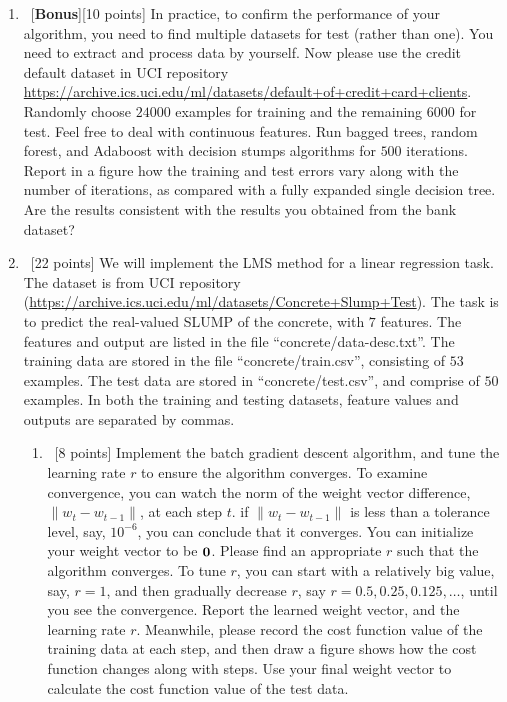 \documentclass[12pt, fullpage,letterpaper]{article}
\begin{document}
\begin{enumerate}
\item~[\textbf{Bonus}][10 points] In practice, to confirm the performance of your algorithm, you need to find multiple datasets for test (rather than one). You need to extract and process data by yourself. Now please use the credit default dataset in UCI repository \href{https://archive.ics.uci.edu/ml/datasets/default+of+credit+card+clients}{https://archive.ics.uci.edu/ml/datasets/default+of+credit+card+clients}. Randomly choose $24000$ examples for training and the remaining $6000$ for test. Feel free to deal with continuous features. Run bagged trees, random forest, and Adaboost with decision stumps algorithms for $500$ iterations. Report in a figure how the training and test errors vary along with the number of iterations, as compared with a fully expanded single decision tree. Are the results consistent with the results you obtained from the bank dataset?

	\item~[22 points] We will implement the LMS method for a linear regression task. The dataset is from UCI repository (\url{https://archive.ics.uci.edu/ml/datasets/Concrete+Slump+Test}). The task is to predict the real-valued SLUMP of the concrete, with $7$ features. The features and output are listed in the file ``concrete/data-desc.txt''. The training data are stored in the file ``concrete/train.csv'', consisting of $53$ examples. The test data are stored in ``concrete/test.csv'', and comprise of $50$ examples. In both the training and testing datasets, feature values and outputs are separated by commas. 
	
	\begin{enumerate}
		\item~[8 points] Implement the batch gradient descent algorithm, and tune the learning rate $r$ to ensure the algorithm converges.  To examine convergence, you can watch the norm of the weight vector difference,  $\|w_{t} - w_{t-1}\|$,  at each step $t$.  if $\|w_{t} - w_{t-1}\|$ is  less than a tolerance level, say, $10^{-6}$, you can conclude that it converges. You can initialize your weight vector to be ${\bf 0}$.  Please find an appropriate $r$ such that the algorithm converges. To tune $r$, you can start with a relatively big value, say, $r=1$, and then gradually decrease $r$, say $r=0.5, 0.25, 0.125, \ldots$, until you see the convergence. 
		Report the learned weight vector, and the learning rate $r$. Meanwhile, please record the cost function  value of the training data at each step, and then draw a figure shows how the cost function changes along with steps. Use your final weight vector to calculate  the cost function value of the test data. 


\end{enumerate}
\end{enumerate}
\end{document}
